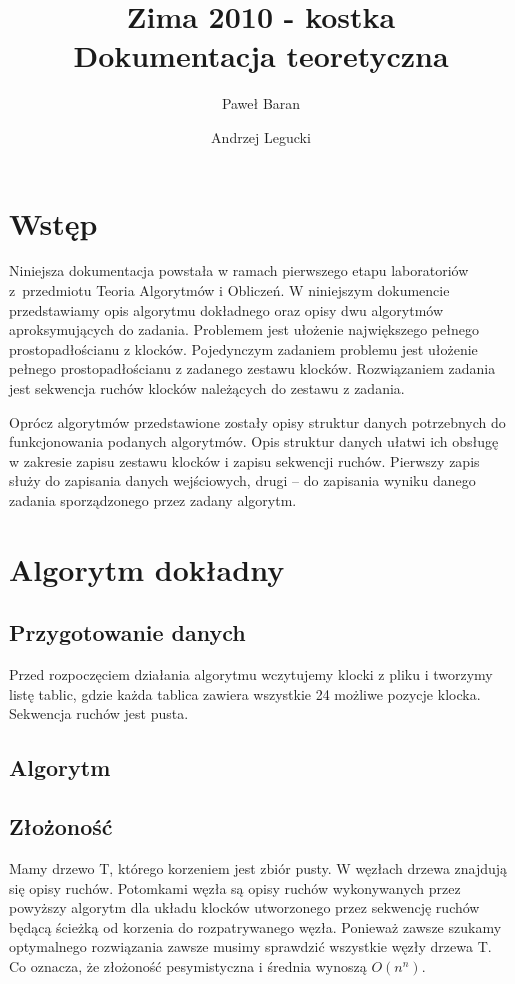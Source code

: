 \documentclass[12pt]{article}
\title{
\Huge{
Zima 2010 - kostka
} \\[0.5em]
\LARGE{
Dokumentacja teoretyczna
}
}
\author{
	Paweł Baran \and Andrzej Legucki
}
\begin{document}
\maketitle

\newpage

\tableofcontents

\newpage
\section{Wstęp}
Niniejsza dokumentacja powstała w ramach pierwszego etapu laboratoriów
z~przedmiotu Teoria Algorytmów i Obliczeń. W niniejszym dokumencie
przedstawiamy opis algorytmu dokładnego oraz opisy dwu algorytmów
aproksymujących do zadania. Problemem jest ułożenie największego
pełnego prostopadłościanu z klocków. Pojedynczym zadaniem problemu jest
ułożenie pełnego prostopadłościanu z zadanego zestawu klocków.
Rozwiązaniem zadania jest sekwencja ruchów klocków należących do zestawu
z zadania.

Oprócz algorytmów przedstawione zostały opisy struktur danych potrzebnych
do funkcjonowania podanych algorytmów. Opis struktur danych ułatwi ich
obsługę w zakresie zapisu zestawu klocków i zapisu sekwencji ruchów.
Pierwszy zapis służy do zapisania danych wejściowych, drugi -- do zapisania
wyniku danego zadania sporządzonego przez zadany algorytm.

\section{Algorytm dokładny}
\subsection{Przygotowanie danych}
Przed rozpoczęciem działania algorytmu wczytujemy klocki z pliku i tworzymy listę tablic, 
gdzie każda tablica zawiera wszystkie 24 możliwe pozycje klocka. Sekwencja ruchów jest pusta.
\subsection{Algorytm}

\subsection{Złożoność}
Mamy drzewo T, którego korzeniem jest zbiór pusty. W węzłach drzewa znajdują się opisy ruchów.
Potomkami węzła są opisy ruchów wykonywanych przez powyższy algorytm dla układu klocków utworzonego 
przez sekwencję ruchów będącą ścieżką od korzenia do rozpatrywanego węzła. 
Ponieważ zawsze szukamy optymalnego rozwiązania zawsze musimy sprawdzić wszystkie węzły drzewa T.
Co oznacza, że złożoność pesymistyczna i średnia wynoszą $O(n^n)$.
\end{document}
